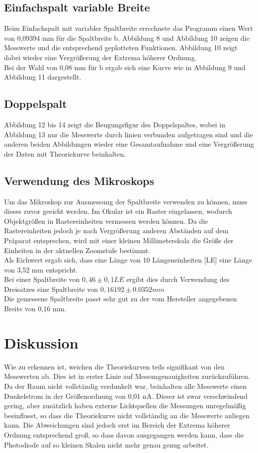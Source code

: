 \subsection{Einfachspalt variable Breite}
Beim Einfachspalt mit variabler Spaltbreite errechnete das Programm einen Wert von 0,09394 mm für die Spaltbreite b. Abbildung 8 und Abbildung 10 zeigen die Messwerte und die entsprechend geplotteten Funktionen. Abbildung 10 zeigt dabei wieder eine Vergrößerung der Extrema höherer Ordnung.\\
Bei der Wahl von 0,08 mm für b ergab sich eine Kurve wie in Abbildung 9 und Abbildung 11 dargestellt.\\

\subsection{Doppelspalt}
Abbildung 12 bis 14 zeigt die Beugungsfigur des Doppelspaltes, wobei in Abbildung 13 nur die Messwerte durch linien verbunden aufgetragen sind und die anderen beiden Abbildungen wieder eine Gesamtaufnahme und eine Vergrößerung der Daten mit Theoriekurve beinhalten.

\subsection{Verwendung des Mikroskops}
Um das Mikroskop zur Ausmessung der Spaltbreite verwenden zu können, muss dieses zuvor geeicht werden. Im Okular ist ein Raster eingelassen, wodurch Objektgrößen in Rastereinheiten vermessen werden können. Da die Rastereinheiten jedoch je nach Vergrößerung anderen Abständen auf dem Präparat entsprechen, wird mit einer kleinen Millimeterskala die Größe der Einheiten in der aktuellen Zoomstufe bestimmt.\\
Als Eichwert ergab sich, dass eine Länge von 10 Längeneinheiten [LE] eine Länge von 3,52 mm entspricht.\\
Bei einer Spaltbreite von $0,46\pm 0,1 LE$ ergibt dies durch Verwendung des Dreisatzes eine Spaltbreite von $0,16192\pm 0.0352 mm$\\
Die gemessene Spaltbreite passt sehr gut zu der vom Hersteller angegebenen Breite von 0,16 mm. 

\section{Diskussion}
Wie zu erkennen ist, weichen die Theoriekurven teils signifikant von den Messwerten ab. Dies ist in erster Linie auf Messungenauigkeiten zurückzuführen. Da der Raum nicht vollständig verdunkelt war, beinhalten alle Messwerte einen Dunkelstrom in der Größenordnung von 0,01 nA. Dieser ist zwar verschwindend gering, aber zusätzlich haben externe Lichtquellen die Messungen unregelmäßig beeinflusst, so dass die Theoriekurve nicht vollständig an die Messwerte anliegen kann.
Die Abweichungen sind jedoch erst im Bereich der Extrema höherer Ordnung entsprechend groß, so dass davon ausgegangen werden kann, dass die Photodiode auf so kleinen Skalen nicht mehr genau genug arbeitet.

